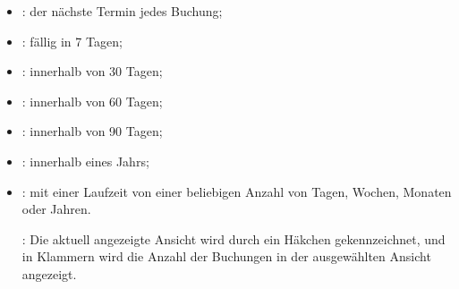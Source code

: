 \noindent
\begin{minipage}{.65\linewidth}
	\begin{itemize}[rightmargin=.6cm]
		\item {}: der nächste Termin jedes Buchung;
		\item {}: fällig in 7 Tagen;
		\item {}: innerhalb von 30 Tagen;
		\item {}: innerhalb von 60 Tagen;
		\item {}: innerhalb von 90 Tagen;
		\item {}: innerhalb eines Jahrs;
		\item {}: mit einer Laufzeit von einer beliebigen Anzahl von Tagen, Wochen, Monaten oder Jahren.
		
		\Note{}: Die aktuell angezeigte Ansicht wird durch ein Häkchen gekennzeichnet, und in Klammern wird die Anzahl der Buchungen in der ausgewählten Ansicht angezeigt.
	\end{itemize}
\end{minipage}
